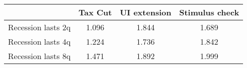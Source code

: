 \begin{tabular}{@{}lccc@{}} 
\toprule 
& Tax Cut    & UI extension    & Stimulus check    \\  \midrule 
Recession lasts 2q &1.096  & 1.844  & 1.689     \\ 
Recession lasts 4q &1.224  & 1.736  & 1.842     \\ 
Recession lasts 8q &1.471  & 1.892  & 1.999     \\ 
\end{tabular}  

